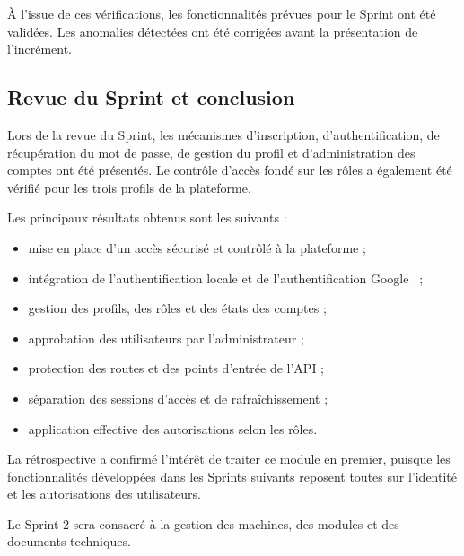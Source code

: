 À l'issue de ces vérifications, les fonctionnalités prévues pour le Sprint ont été validées. Les anomalies détectées ont été corrigées avant la présentation de l'incrément.

\subsection{Revue du Sprint et conclusion}

Lors de la revue du Sprint, les mécanismes d'inscription, d'authentification, de récupération du mot de passe, de gestion du profil et d'administration des comptes ont été présentés. Le contrôle d'accès fondé sur les rôles a également été vérifié pour les trois profils de la plateforme.

Les principaux résultats obtenus sont les suivants :

\begin{itemize}
    \item mise en place d'un accès sécurisé et contrôlé à la plateforme ;
    \item intégration de l'authentification locale et de l'authentification Google~\cite{google_oauth} ;
    \item gestion des profils, des rôles et des états des comptes ;
    \item approbation des utilisateurs par l'administrateur ;
    \item protection des routes et des points d'entrée de l'API ;
    \item séparation des sessions d'accès et de rafraîchissement ;
    \item application effective des autorisations selon les rôles.
\end{itemize}

La rétrospective a confirmé l'intérêt de traiter ce module en premier, puisque les fonctionnalités développées dans les Sprints suivants reposent toutes sur l'identité et les autorisations des utilisateurs.

Le Sprint 2 sera consacré à la gestion des machines, des modules et des documents techniques.
